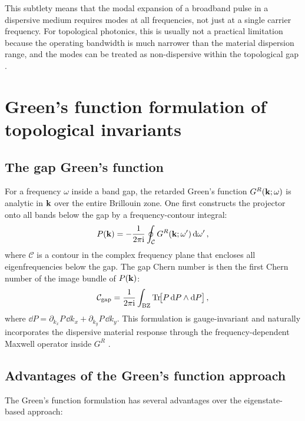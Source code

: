 This subtlety means that the modal expansion of a broadband pulse in a
dispersive medium requires modes at all frequencies, not just at a
single carrier frequency.  For topological photonics, this is usually
not a practical limitation because the operating bandwidth is much
narrower than the material dispersion range, and the modes can be
treated as non-dispersive within the topological gap
\cite{gangaraj2016berry,price2022roadmap}.

\section{Green's function formulation of topological invariants}
\label{sec:ch3-green-function}
\subsection{The gap Green's function}
\label{sec:ch3-gap-green}

For a frequency $\omega$ inside a band gap, the retarded Green's
function $G^R(\mathbf{k};\omega)$ is analytic in $\mathbf{k}$ over the entire
Brillouin zone.  One first constructs the projector onto all bands
below the gap by a frequency-contour integral:
\begin{equation}\label{eq:ch3-green-projector}
  P(\mathbf{k}) = -\frac{1}{2\pi\mathrm{i}}\oint_{\mathcal{C}}
  G^R(\mathbf{k};\omega')\,\mathrm{d}\omega'\,,
\end{equation}
where $\mathcal{C}$ is a contour in the complex frequency plane that
encloses all eigenfrequencies below the gap.
The gap Chern number is then the first Chern number of the image
bundle of $P(\mathbf{k})$:
\begin{equation}\label{eq:ch3-green-chern}
  \mathcal{C}_{\mathrm{gap}}
  = \frac{1}{2\pi\mathrm{i}}\int_{\mathrm{BZ}}\operatorname{Tr}\!\bigl[
    P\,\mathrm{d} P\wedge\mathrm{d} P
  \bigr]\,,
\end{equation}
where $\dd P=\partial_{k_x}P\,\dd k_x+\partial_{k_y}P\,\dd k_y$.
This formulation is gauge-invariant and naturally incorporates the
dispersive material response through the frequency-dependent Maxwell
operator inside $G^R$
\cite{web2026r,silveirinha2016bulk}.

\subsection{Advantages of the Green's function approach}
\label{sec:ch3-green-advantages}

The Green's function formulation has several advantages over the
eigenstate-based approach:

